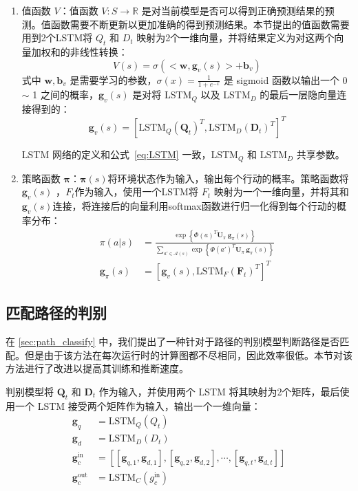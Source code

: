 \begin{enumerate}
	\item 值函数 $V$：值函数 $V: S\rightarrow \mathbb{R}$ 是对当前模型是否可以得到正确预测结果的预测。值函数需要不断更新以更加准确的得到预测结果。本节提出的值函数需要用到2个LSTM将 $Q_t$ 和 $D_t$ 映射为2个一维向量，并将结果定义为对这两个向量加权和的非线性转换：
\begin{equation}
\label{eq:MCTS_value}
V(s) = \sigma (<\mathbf{w}, \mathbf{g}_v(s)> + \mathbf{b}_v)
\end{equation}
式中 $\mathbf{w}, \mathbf{b}_v$ 是需要学习的参数，$
\sigma(x) = \frac{1}{1+e^{-x}}$ 是 sigmoid 函数以输出一个 0 $\sim$ 1 之间的概率，$\mathbf{g}_v(s)$ 是对将 LSTM$_Q$ 以及 LSTM$_D$ 的最后一层隐向量连接得到的：
\begin{equation}
\mathbf{g}_v(s) = [\mathrm{LSTM}_Q(\mathbf{Q}_t)^T, \mathrm{LSTM}_D(\mathbf{D}_{t})^T]^T
\end{equation}

LSTM 网络的定义和公式~\ref{eq:LSTM} 一致，LSTM$_Q$ 和 LSTM$_D$ 共享参数。

	\item 策略函数 $\mathbf{\pi}$：$\mathbf{\pi}(s)$将环境状态作为输入，输出每个行动的概率。策略函数将 $\mathbf{g}_v(s)$ ，$F_t$作为输入，使用一个LSTM将	$F_t$ 映射为一个一维向量，并将其和$\mathbf{g}_v(s)$连接，将连接后的向量利用softmax函数进行归一化得到每个行动的概率分布：
\begin{equation}
\label{eq:MCTS_policy}
\begin{aligned}
\pi(a|s) &= \frac{\exp\left\{\Phi(a)^T \mathbf{U}_\pi ~\mathbf{g}_\pi(s)\right\}}{\sum_{a'\in\mathcal{A}(s)} \exp\left\{\Phi(a')^T \mathbf{U}_\pi ~\mathbf{g}_\pi(s)\right\}} \\
\mathbf{g}_\pi(s) &= [\mathbf{g}_v(s) , \mathrm{LSTM}_F(\mathbf{F}_{t})^T]^T
\end{aligned}
\end{equation}

\end{enumerate}

\subsection{匹配路径的判别}
在 \ref{sec:path_classify} 中，我们提出了一种针对于路径的判别模型判断路径是否匹配。但是由于该方法在每次运行时的计算图都不尽相同，因此效率很低。本节对该方法进行了改进以提高其训练和推断速度。

判别模型将 $\mathbf{Q}_t$ 和 $\mathbf{D}_t$ 作为输入，并使用两个 LSTM 将其映射为2个矩阵，最后使用一个 LSTM 接受两个矩阵作为输入，输出一个一维向量：
\begin{equation}
\label{eq:path_classification}
\begin{aligned}
\mathbf{g}_q &= \mathrm{LSTM}_Q(Q_t)\\
\mathbf{g}_d &= \mathrm{LSTM}_D(D_t)\\
\mathbf{g}_c^{\text{in}} &= [[\mathbf{g}_{q, 1}, \mathbf{g}_{d, 1}], [\mathbf{g}_{q, 2}, \mathbf{g}_{d, 2}], \cdots, [\mathbf{g}_{q, t}, \mathbf{g}_{d, t}]]\\
\mathbf{g}_c^{\text{out}} &= \mathrm{LSTM}_C({g}_c^{\text{in}})
\end{aligned}
\end{equation}

